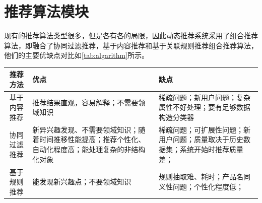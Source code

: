   \section{推荐算法模块}
  现有的推荐算法类型很多，但是各有各的局限，因此动态推荐系统采用了组合推荐算法，即融合了协同过滤推荐，基于内容推荐和基于关联规则推荐组合推荐算法，他们的主要优缺点对比如\autoref{tab:algarithm}所示。
  \begin{table}[htp]
  \centering
  \label{tab:algarithm}
  \begin{tabular}{ |c|p{6cm}|p{6cm}| } \hline
   推荐方法 & 优点 & 缺点 \\ \hline
   基于内容推荐 & 推荐结果直观，容易解释；不需要领域知识 & 稀疏问题；新用户问题；复杂属性不好处理；要有足够数据构造分类器 \\ \hline
   协同过滤推荐 & 新异兴趣发现、不需要领域知识；随着时间推移性能提高；推荐个性化、自动化程度高；能处理复杂的非结构化对象 & 稀疏问题；可扩展性问题；新用户问题；质量取决于历史数据集；系统开始时推荐质量差； \\ \hline
   基于规则推荐 & 能发现新兴趣点；不要领域知识 & 规则抽取难、耗时；产品名同义性问题；个性化程度低； \\ \hline
  \end{tabular}
  \end{table}
    

